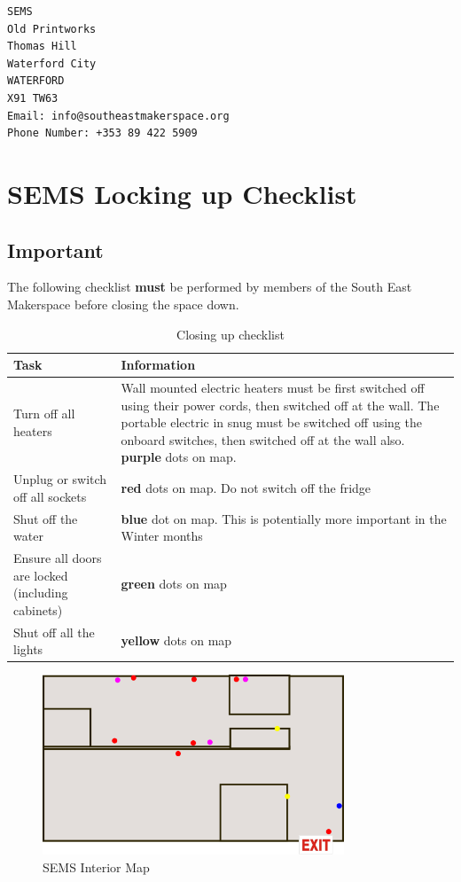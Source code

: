 \documentclass{article}
\begin{document}
\begin{verbatim}
SEMS
Old Printworks
Thomas Hill
Waterford City
WATERFORD
X91 TW63
Email: info@southeastmakerspace.org
Phone Number: +353 89 422 5909
\end{verbatim} \par

\section*{SEMS Locking up Checklist}

\subsection*{Important}
The following checklist \textbf{must} be performed by members of the South East Makerspace before closing the space down.


\begin{table}[h]
	\centering
	\caption{Closing up checklist} 
	\label{tab:checklist}
	\begin{tabularx}{.9\textwidth}{XX}
		\toprule
		\textbf{Task} & \textbf{Information} \\ 
		\midrule
		Turn off all heaters & Wall mounted electric heaters must be first switched off using their power cords, then switched off at the wall. The portable electric in snug must be switched off using the onboard switches, then switched off at the wall also. \textbf{purple} dots on map. \\ 
		Unplug or switch off all sockets & \textbf{red} dots on map. Do not switch off the fridge \\ 
		Shut off the water & \textbf{blue} dot on map. This is potentially more important in the Winter months \\ 
		Ensure all doors are locked (including cabinets) & \textbf{green} dots on map \\ 
		Shut off all the lights & \textbf{yellow} dots on map \\ 
		\bottomrule
	\end{tabularx}
\end{table}

%
\begin{figure}[ht]
	\centering
	\includegraphics[width=9cm]{Sems}
	\caption{SEMS Interior Map}
	\label{fig:sems_map}
\end{figure}
%
\end{document}
